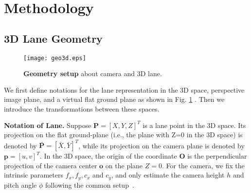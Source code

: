 \documentclass[letterpaper]{article} \usepackage{aaai22}  \usepackage{times}  \usepackage{helvet}  \usepackage{courier}  \usepackage[hyphens]{url}  \usepackage{graphicx} \urlstyle{rm} \def\UrlFont{\rm}  \usepackage{natbib}  \usepackage{caption}
\begin{document}
\section{Methodology}


\subsection{3D Lane Geometry}
\label{subsec:geometry}

\begin{figure}[t]
\begin{center}
\texttt{[image: geo3d.eps]}
\end{center}
\caption{\textbf{Geometry setup} about camera and 3D lane.}
\label{fig:geometry}
\end{figure}

We first define notations for the lane representation in the 3D space, perspective image plane, and a virtual flat ground plane as shown in Fig. \ref{fig:geometry} . Then we introduce the transformations between these spaces. 

\noindent \textbf{Notation of Lane.}
Suppose $\mathbf{P}=\left[X, Y, Z\right]^T$ is a lane point in the 3D space.  Its projection on the flat ground-plane (i.e.,  the plane with Z=0 in the 3D space) is denoted by $\bar{\mathbf{P}}=\left[\bar{X}, \bar{Y}\right]^T$, while its projection on the camera plane is denoted by $\mathbf{p}=\left[u, v\right]^T$.  In the 3D space,  the origin of the coordinate $\mathbf{O}$ is the perpendicular projection of the camera center $\mathbf{o}$ on the plane $Z=0$. For the camera, we fix the intrinsic parameters $f_x, f_y, c_x$ and $ c_y$, and only estimate the camera height $h$ and pitch angle $\phi$ following the common setup~\cite{3DLaneNet,GenLaneNet}.
\end{document}
